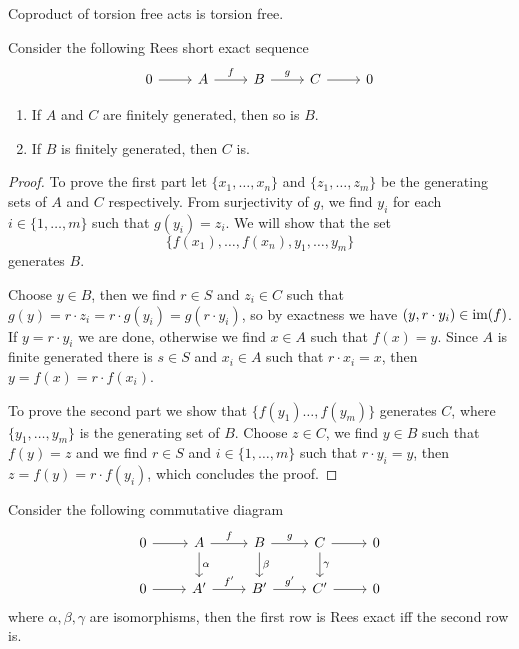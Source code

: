 \begin{corollary}
    Coproduct of torsion free acts is torsion free.
\end{corollary}
\begin{proposition}
    Consider the following Rees short exact sequence 
    \[\begin{tikzcd}
	0 & A & B & C & 0
	\arrow[from=1-1, to=1-2]
	\arrow["f", from=1-2, to=1-3]
	\arrow["g", from=1-3, to=1-4]
	\arrow[from=1-4, to=1-5]
    \end{tikzcd}\]
    \begin{enumerate}
        \item If $A$ and $C$ are finitely generated, then so is $B$.
        \item If $B$ is finitely generated, then $C$ is.
    \end{enumerate}
    
\end{proposition}
\begin{proof}[Proof]
    To prove the first part let $\{x_1,\dots,x_n\}$ and $\{z_1,\dots,z_m\}$ be the generating sets 
    of $A$ and $C$ respectively. From surjectivity of $g$, we find $y_i$ for each $i\in\{1,\dots,m\}$
    such that $g(y_i)=z_i$. We will show that the set \[\{f(x_1),\dots,f(x_n),y_1,\dots,y_m\}\] 
    generates $B$.\par Choose $y\in B$, then we find $r\in S$ and $z_i\in C$ such that 
    $g(y)=r\cdot z_i = r\cdot g(y_i) = g(r\cdot y_i)$, so by exactness we have 
    $(y,r\cdot y_i)\in\text{im}(f)$. If $y=r\cdot y_i$ we are done, otherwise we find 
    $x\in A$ such that $f(x)=y$. Since $A$ is finite generated there is $s\in S$ and 
    $x_i\in A$ such that $r\cdot x_i = x$, then $y=f(x)=r\cdot f(x_i)$.\par 
    To prove the second part we show that $\{f(y_1)\dots,f(y_m)\}$ generates $C$, where 
    $\{y_1,\dots,y_m\}$ is the generating set of $B$. Choose $z\in C$, we find $y\in B$ such that 
    $f(y)=z$ and we find $r\in S$ and $i\in\{1,\dots,m\}$ such that $r\cdot y_i = y$, then 
    $z = f(y) = r\cdot f(y_i)$, which concludes the proof.
\end{proof}
\begin{lemma}
    Consider the following commutative diagram
    \[\begin{tikzcd}
	0 & A & B & C & 0 \\
	0 & {A'} & {B'} & {C'} & 0
	\arrow[from=1-1, to=1-2]
	\arrow["f", from=1-2, to=1-3]
	\arrow["\alpha", from=1-2, to=2-2]
	\arrow["g", from=1-3, to=1-4]
	\arrow["\beta", from=1-3, to=2-3]
	\arrow[from=1-4, to=1-5]
	\arrow["\gamma", from=1-4, to=2-4]
	\arrow[from=2-1, to=2-2]
	\arrow["{f'}", from=2-2, to=2-3]
	\arrow["{g'}", from=2-3, to=2-4]
	\arrow[from=2-4, to=2-5]
\end{tikzcd}\]
    where $\alpha, \beta, \gamma$ are isomorphisms, 
    then the first row is Rees exact iff the second row is.
\end{lemma}
